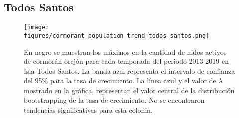 \documentclass{article} %
\begin{document}
\subsection*{Todos Santos}

\begin{figure}[H]
\hspace{-2cm}
    \texttt{[image: figures/cormorant\_population\_trend\_todos\_santos.png]}
\caption{En negro se muestran los máximos en la cantidad de nidos activos de cormorán orejón para cada temporada del periodo 2013-2019 en Isla Todos Santos. La banda azul representa el intervalo de confianza del 95\% para la tasa de crecimiento. La línea azul y el valor de $\lambda$ mostrado en la gráfica, representan el valor central de la distribución bootstrapping de la tasa de crecimiento. No se encontraron tendencias significativas para esta colonia.}
\end{figure}

 

\end{document}
